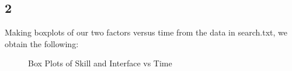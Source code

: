 \documentclass{article}
\begin{document}
    \subsection*{2}
    Making boxplots of our two factors versus time from the data in search.txt, we obtain the following:
	\begin{figure}[H]
		\centering
          \caption{Box Plots of Skill and Interface vs Time}
          \label{fig:srchbox}
	\end{figure}
	
\end{document}

